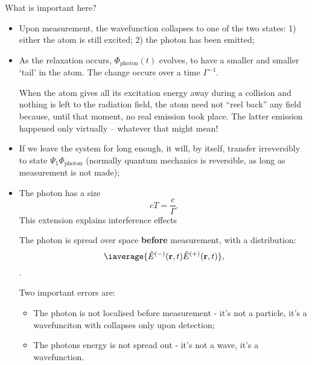  What is important here?
 \begin{itemize}
 \item Upon measurement,  the wavefunction collapses to one  of the two
   states: 1) either the atom is  still excited; 2) the photon has been
   emitted;
 \item As  the relaxation occurs, $  \Phi_{\text{photon}}(t) $ evolves,
   to have a smaller and smaller  `tail' in the atom. The change occurs
   over a time $ \Gamma^{-1} $.
   \begin{framed}\noindent
     When  the atom  gives  all  its excitation  energy  away during  a
     collision and  nothing is  left to the  radiation field,  the atom
     need not “reel back” any field because, until that moment, no real
     emission took place. The latter emission happened only virtually –
     whatever that might mean!
   \end{framed}
 \item If  we leave  the system  for long enough,  it will,  by itself,
   transfer   irreversibly  to   state  $   \Psi_1\Phi_\text{photon}  $
   (normally quantum mechanics is reversible, as long as measurement is
   not made);
 \item The photon has a size
   \begin{equation}
     cT = \frac{c}{\Gamma}.
   \end{equation}
   \noindent This extension explains interference effects
   \begin{framed}\noindent
     The photon is spread  over space \textbf{before} measurement, with
     a distribution:
     \begin{equation}
       \iaverage{\hat{E}^{(-)}(\mathbf{r},t)\hat{E}^{(+)}(\mathbf{r},t)},
     \end{equation}
     \noindent  {}.

      Two important
     errors are:
     \begin{itemize}
     \item The photon is not localised  before measurement - it's not a
       particle,  it's   a  wavefunciton   with  collapses   only  upon
       detection;
     \item The photons energy is not spread out - it's not a wave, it's
       a wavefunction.
     \end{itemize}
   \end{framed}


\end{itemize}
